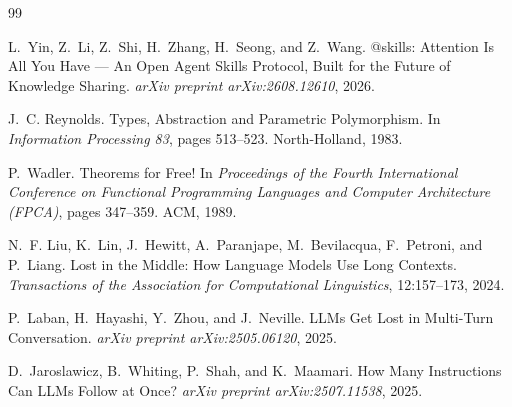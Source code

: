 \documentclass[11pt]{article}
\begin{document}
\begin{thebibliography}{99}

L.~Yin, Z.~Li, Z.~Shi, H.~Zhang, H.~Seong, and Z.~Wang.
\newblock @skills: Attention Is All You Have --- An Open Agent Skills Protocol, Built for the Future of Knowledge Sharing.
\newblock \emph{arXiv preprint arXiv:2608.12610}, 2026.

J.~C. Reynolds.
\newblock Types, Abstraction and Parametric Polymorphism.
\newblock In \emph{Information Processing 83}, pages 513--523. North-Holland, 1983.

P.~Wadler.
\newblock Theorems for Free!
\newblock In \emph{Proceedings of the Fourth International Conference on Functional Programming Languages and Computer Architecture (FPCA)}, pages 347--359. ACM, 1989.

N.~F. Liu, K.~Lin, J.~Hewitt, A.~Paranjape, M.~Bevilacqua, F.~Petroni, and P.~Liang.
\newblock Lost in the Middle: How Language Models Use Long Contexts.
\newblock \emph{Transactions of the Association for Computational Linguistics}, 12:157--173, 2024.

P.~Laban, H.~Hayashi, Y.~Zhou, and J.~Neville.
\newblock LLMs Get Lost in Multi-Turn Conversation.
\newblock \emph{arXiv preprint arXiv:2505.06120}, 2025.

D.~Jaroslawicz, B.~Whiting, P.~Shah, and K.~Maamari.
\newblock How Many Instructions Can LLMs Follow at Once?
\newblock \emph{arXiv preprint arXiv:2507.11538}, 2025.

\end{thebibliography}
\end{document}
